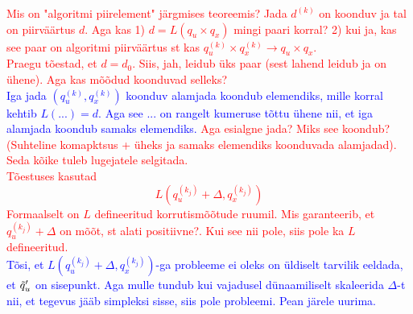 \textcolor{red}{Mis on "algoritmi piirelement" järgmises teoreemis? Jada $d^{(k)}$ on koonduv ja tal on piirväärtus $d$. Aga kas 1) $d=L(q_u\times q_x)$ mingi paari korral? 2) kui ja, kas see paar on algoritmi piirväärtus st kas $q^{(k)}_u\times q_x^{(k)}\to q_u\times q_x$. \\
Praegu tõestad, et $d=d_0$. Siis, jah, leidub üks paar (sest lahend leidub ja on ühene). Aga kas mõõdud koonduvad selleks?}
\\ \textcolor{blue}{
Iga jada $(q^{(k)}_u, q_x^{(k)})$ koonduv alamjada koondub elemendiks, mille korral kehtib $L(...)=d$. Aga see ... on rangelt kumeruse tõttu ühene nii, et iga alamjada koondub samaks elemendiks.}
\textcolor{red}{Aga esialgne jada? Miks see koondub? (Suhteline komapktsus + üheks ja samaks elemendiks koonduvada alamjadad). Seda kõike tuleb lugejatele selgitada.\\
Tõestuses kasutad 
$$L(q_u^{(k_j)}+\Delta,q_x^{(k_j)})$$
Formaalselt on $L$ defineeritud korrutismõõtude ruumil. Mis garanteerib, et  $q_u^{(k_j)}+\Delta$ on mõõt, st alati positiivne?. Kui see nii pole, siis pole ka $L$ defineeritud.}
\\ \textcolor{blue}{Tõsi, et $L(q_u^{(k_j)}+\Delta,q_x^{(k_j)})$-ga probleeme ei oleks on üldiselt tarvilik eeldada, et $\Tilde{q}'_u$ on sisepunkt. Aga mulle tundub kui vajadusel dünaamiliselt skaleerida $\Delta$-t nii, et tegevus jääb simpleksi sisse, siis pole probleemi. Pean järele uurima.}


